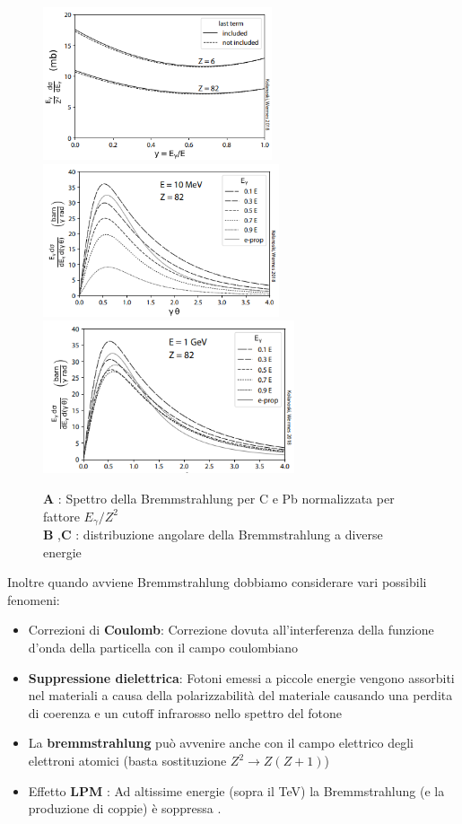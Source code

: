 \begin{figure}[H]
    \centering
    \includegraphics[height=4.5cm,frame]{Chapters/images/Interazione_radiazione_materia/image-20220220135143452.png}
    \includegraphics[height=4.5cm,frame]{Chapters/images/Interazione_radiazione_materia/image-20220220135223580.png}
    \includegraphics[height=4.5cm,frame]{Chapters/images/Interazione_radiazione_materia/image-20220220135322598.png}
    \captionsetup{width=0.9\linewidth}
    \caption{\textbf{A} : Spettro della Bremmstrahlung per C e Pb normalizzata per fattore $E_\gamma/Z^2$ \\ \textbf{B} ,\textbf{C} : distribuzione angolare della Bremmstrahlung a diverse energie}
    \label{fig:}
\end{figure}
Inoltre quando avviene Bremmstrahlung dobbiamo considerare vari possibili fenomeni:
\begin{itemize}
    \item Correzioni di \textbf{Coulomb}:  Correzione dovuta all'interferenza della funzione d'onda della particella con il campo coulombiano

\item \textbf{Suppressione dielettrica}: Fotoni emessi a piccole energie vengono assorbiti nel materiali a causa della polarizzabilità del materiale causando una perdita di coerenza e un cutoff infrarosso nello spettro del fotone

\item La \textbf{bremmstrahlung}  può avvenire anche con il campo elettrico degli elettroni atomici (basta sostituzione $Z^2 \to Z(Z+1)$)

\item Effetto \textbf{LPM} : Ad altissime energie (sopra il TeV) la Bremmstrahlung (e la produzione di coppie) è soppressa .
\end{itemize}
